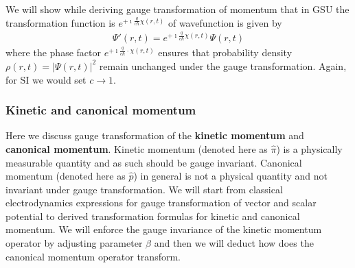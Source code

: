 \documentclass[11pt]{article}
\begin{document}
We will show  while deriving  gauge transformation of momentum that  in GSU  the  transformation function is  $e^{+\imath  \frac{q}{c \hbar} \chi(r,t) }$   of wavefunction is given by
\begin{align*}
    \Psi'(r,t) = e^{+\imath  \frac{q}{c \hbar} \chi(r,t) } \Psi(r,t)
\end{align*}
    where  the phase factor $e^{+\imath  \frac{q}{c \hbar} \cdot \chi(r,t) }$ ensures that  probability density $\rho(r,t)= |\Psi(r,t)|^2$ remain unchanged  under the gauge transformation. Again, for SI we would set $c \to 1$.



\subsubsection{Kinetic and canonical momentum}
Here we discuss gauge transformation of the {\bf kinetic momentum} and   {\bf canonical momentum}.
Kinetic momentum (denoted here as  $\hat  \pi$) is a physically measurable quantity and as such should be gauge invariant. Canonical momentum (denoted here as $\hat p$) in general is not a physical quantity and not invariant under gauge  transformation. 
We will start from   classical electrodynamics  expressions  for gauge transformation of vector and scalar potential to derived  transformation  formulas for kinetic and canonical momentum.  We will enforce the gauge invariance of the kinetic momentum operator  by adjusting parameter $\beta$ and then we will deduct how does the canonical momentum operator transform.
\end{document}
